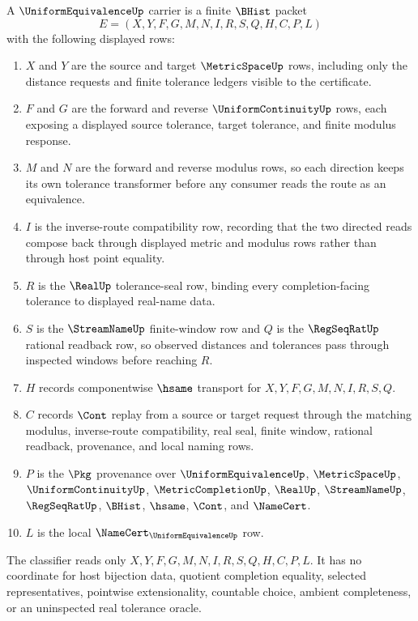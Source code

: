 \begin{definition}
\label{def:uniform-equivalence-carrier}
A $\UniformEquivalenceUp$ carrier is a finite $\BHist$ packet
$$
E=(X,Y,F,G,M,N,I,R,S,Q,H,C,P,L)
$$
with the following displayed rows:
\begin{enumerate}
\item $X$ and $Y$ are the source and target $\MetricSpaceUp$ rows, including only the distance requests and finite tolerance ledgers visible to the certificate.
\item $F$ and $G$ are the forward and reverse $\UniformContinuityUp$ rows, each exposing a displayed source tolerance, target tolerance, and finite modulus response.
\item $M$ and $N$ are the forward and reverse modulus rows, so each direction keeps its own tolerance transformer before any consumer reads the route as an equivalence.
\item $I$ is the inverse-route compatibility row, recording that the two directed reads compose back through displayed metric and modulus rows rather than through host point equality.
\item $R$ is the $\RealUp$ tolerance-seal row, binding every completion-facing tolerance to displayed real-name data.
\item $S$ is the $\StreamNameUp$ finite-window row and $Q$ is the $\RegSeqRatUp$ rational readback row, so observed distances and tolerances pass through inspected windows before reaching $R$.
\item $H$ records componentwise $\hsame$ transport for $X,Y,F,G,M,N,I,R,S,Q$.
\item $C$ records $\Cont$ replay from a source or target request through the matching modulus, inverse-route compatibility, real seal, finite window, rational readback, provenance, and local naming rows.
\item $P$ is the $\Pkg$ provenance over $\UniformEquivalenceUp$, $\MetricSpaceUp$, $\UniformContinuityUp$, $\MetricCompletionUp$, $\RealUp$, $\StreamNameUp$, $\RegSeqRatUp$, $\BHist$, $\hsame$, $\Cont$, and $\NameCert$.
\item $L$ is the local $\NameCert_{\UniformEquivalenceUp}$ row.
\end{enumerate}
The classifier reads only $X,Y,F,G,M,N,I,R,S,Q,H,C,P,L$. It has no coordinate for host bijection data, quotient completion equality, selected representatives, pointwise extensionality, countable choice, ambient completeness, or an uninspected real tolerance oracle.
\end{definition}

